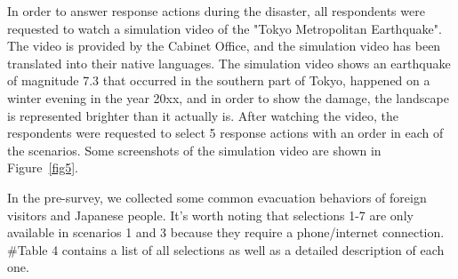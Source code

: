 In order to answer response actions during the disaster, all respondents were requested to watch a simulation video of the "Tokyo Metropolitan Earthquake". The video is provided by the Cabinet Office,  and the simulation video has been translated into their native languages. The simulation video shows an earthquake of magnitude 7.3 that occurred in the southern part of Tokyo, happened on a winter evening in the year 20xx, and in order to show the damage, the landscape is represented brighter than it actually is. After watching the video, the respondents were requested to select 5 response actions with an order in each of the scenarios. Some screenshots of the simulation video are shown in Figure~\ref{fig5}.

In the pre-survey, we collected some common evacuation behaviors of foreign visitors and Japanese people. It's worth noting that selections 1-7 are only available in scenarios 1 and 3 because they require a phone/internet connection. \#Table 4 contains a list of all selections as well as a detailed description of each one.


